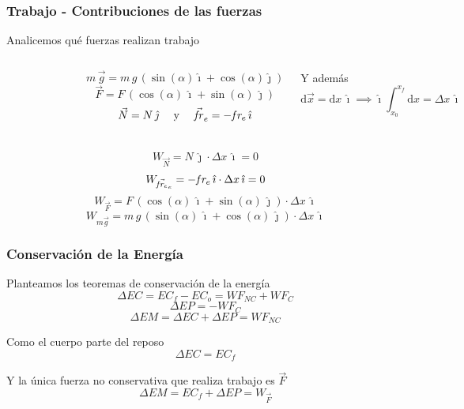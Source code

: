 \documentclass[a4paper]{beamer}
\newcommand{\fr}{\ensuremath{\mathit{f\kern-0.12em r}}}
\newcommand{\fre}{\ensuremath{\mathit{f\kern-0.05em r}\kern-0.05em_{e}}}
\newcommand{\uveci}{\hat{\imath}}
\newcommand{\uvecj}{\hat{\jmath}}
\begin{document}




\begin{frame}
	\frametitle{Trabajo - Contribuciones de las fuerzas}
	Analicemos qué fuerzas realizan trabajo
	\begin{columns}
		\begin{figure}
		\end{figure}
		$$ m\,\vec{g} = m\,g\,(\sin(\alpha) \uveci + \cos(\alpha) \uvecj) $$
		$$ \vec{F} = F\,(\cos(\alpha)\,\uveci + \sin(\alpha)\,\uvecj )$$
		$$ \vec{N} = N\, \uvecj \ \ \ \text{ y } \ \ \ \vec{\fr}_e = -\fre\, \uveci$$
		\centering

		Y además
		$$ \mathrm{d}\vec{x} = \mathrm{d}x\,\uveci \implies \uveci \int_{x_0}^{x_f} \mathrm{d}x= \Delta x \, \uveci $$
	\end{columns}

	$$ W_{\vec{N}} = N\,\uvecj \cdot \Delta x\, \uveci  = 0$$
	$$ W_{\vec{\fre}_e} = -\fre\,\uveci \cdot \Delta x\, \uveci  = 0$$
	$$ W_{\vec{F}} =F\,(\cos(\alpha)\,\uveci + \sin(\alpha)\,\uvecj ) \cdot \Delta x \, \uveci $$
	$$ W_{m\vec{g}} =m\,g\,(\sin(\alpha)\,\uveci + \cos(\alpha)\,\uvecj ) \cdot \Delta x \, \uveci $$
\end{frame}

\begin{frame}
	\frametitle{Conservación de la Energía}
	Planteamos los teoremas de conservación de la energía
	$$ \Delta EC= EC_f - EC_o = WF_{NC} + WF_C $$
	$$ \Delta EP = - WF_C $$
	$$ \Delta EM = \Delta EC + \Delta EP = WF_{NC} $$

	Como el cuerpo parte del reposo
	$$ \Delta EC = EC_f $$

	Y la única fuerza no conservativa que realiza trabajo es $\vec{F}$
	$$ \Delta EM = EC_f + \Delta EP  = W_{\vec{F}}$$
\end{frame}
\end{document}
